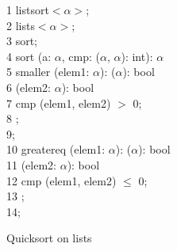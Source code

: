 \begin{appendix}
\begin{Program}
\begin{ttlprog}
1\>\ttlModule{} listsort$<$$\alpha$$>$;\\
2\>\ttlImport{} lists$<$$\alpha$$>$;\\
3\>\ttlExport{} sort;\\
4\>\ttlFun{} sort (a: \ttlList{} \ttlOf{} $\alpha$, cmp: \ttlFun{} ($\alpha$, $\alpha$): int): \ttlList{} \ttlOf{} $\alpha$\\
5\>\>\ttlFun{} smaller (elem1: $\alpha$): \ttlFun{} ($\alpha$): bool\\
6\>\>\>\ttlReturn{} \ttlFun{} (elem2: $\alpha$): bool\\
7\>\>\>\>\>\>\> \ttlReturn{} cmp (elem1, elem2) $>$ 0;\\
8\>\>\>\>\>\> \ttlEnd{};\\
9\>\>\ttlEnd{};\\
10\>\>\ttlFun{} greatereq (elem1: $\alpha$): \ttlFun{} ($\alpha$): bool\\
11\>\>\>\ttlReturn{} \ttlFun{} (elem2: $\alpha$): bool\\
12\>\>\>\>\>\>\> \ttlReturn{} cmp (elem1, elem2) $\leq$ 0;\\
13\>\>\>\>\>\> \ttlEnd{};\\
14\>\>\ttlEnd{};
\end{ttlprog}
\caption{Quicksort on lists}
\label{prog:example-module1}
\end{Program}


\end{appendix}
